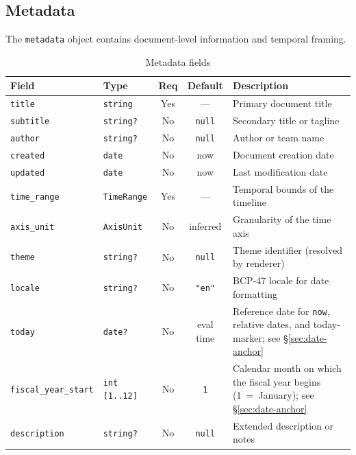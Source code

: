 \subsection{Metadata}
\label{sec:ir-metadata}

The \texttt{metadata} object contains document-level information and temporal framing.

\begin{table}[h]
\centering
\small
\begin{tabular}{llccp{4.5cm}}
\toprule
\textbf{Field} & \textbf{Type} & \textbf{Req} & \textbf{Default} & \textbf{Description} \\
\midrule
\texttt{title} & \texttt{string} & Yes & --- & Primary document title \\
\texttt{subtitle} & \texttt{string?} & No & \texttt{null} & Secondary title or tagline \\
\texttt{author} & \texttt{string?} & No & \texttt{null} & Author or team name \\
\texttt{created} & \texttt{date} & No & now & Document creation date \\
\texttt{updated} & \texttt{date} & No & now & Last modification date \\
\texttt{time\_range} & \texttt{TimeRange} & Yes & --- & Temporal bounds of the timeline \\
\texttt{axis\_unit} & \texttt{AxisUnit} & No & inferred & Granularity of the time axis \\
\texttt{theme} & \texttt{string?} & No & \texttt{null} & Theme identifier (resolved by renderer) \\
\texttt{locale} & \texttt{string?} & No & \texttt{"en"} & BCP-47 locale for date formatting \\
\texttt{today} & \texttt{date?} & No & eval time & Reference date for \texttt{now}, relative dates, and today-marker; see \S\ref{sec:date-anchor} \\
\texttt{fiscal\_year\_start} & \texttt{int [1..12]} & No & \texttt{1} & Calendar month on which the fiscal year begins (1~=~January); see \S\ref{sec:date-anchor} \\
\texttt{description} & \texttt{string?} & No & \texttt{null} & Extended description or notes \\
\bottomrule
\end{tabular}
\caption{Metadata fields}
\label{tab:metadata-fields}
\end{table}

